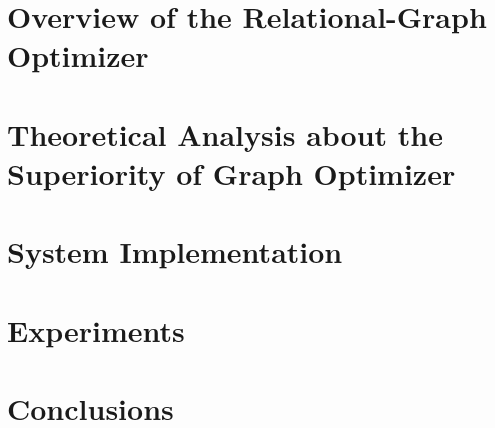 \documentclass[sigconf, nonacm]{acmart}
\begin{document}
\section{Overview of the Relational-Graph Optimizer}
\label{sec:system-design}


\section{Theoretical Analysis about the Superiority of Graph Optimizer}
\label{sec:theoretical-analysis}


\section{System Implementation}
\label{sec:system-implementation}


\section{Experiments}
\label{sec:experiments}


\section{Conclusions}
\label{sec:conclusions}






\end{document}
